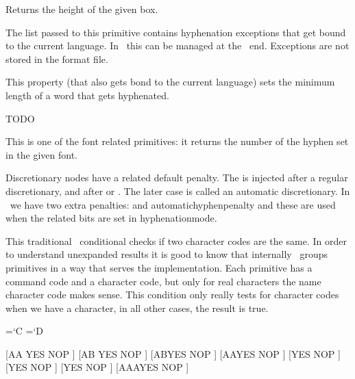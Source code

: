 Returns the height of the given box.

\stopoldprimitive

\startoldprimitive[title={\prm {hyphenation}}]

The list passed to this primitive contains hyphenation exceptions that get bound
to the current language. In \LUAMETATEX\ this can be managed at the \LUA\ end.
Exceptions are not stored in the format file.

\stopoldprimitive

\startnewprimitive[title={\prm {hyphenationmin}}]

This property (that also gets bond to the current language) sets the minimum
length of a word that gets hyphenated.

\stopnewprimitive

\startnewprimitive[title={\prm {hyphenationmode}}]
    TODO
\stopnewprimitive

\startoldprimitive[title={\prm {hyphenchar}}]

This is one of the font related primitives: it returns the number of the hyphen
set in the given font.

\stopoldprimitive

\startoldprimitive[title={\prm {hyphenpenalty}}]

Discretionary nodes have a related default penalty. The  is
injected after a regular discretionary, and  after \type
{\-} or \type {-}. The later case is called an automatic discretionary. In
\LUAMETATEX\ we have two extra penalties:  and \prm
{automatichyphenpenalty} and these are used when the related bits are set in \prm
{hyphenationmode}.

\stopoldprimitive

\startoldprimitive[title={\prm {if}}]

This traditional \TEX\ conditional checks if two character codes are the same. In
order to understand unexpanded results it is good to know that internally \TEX\
groups primitives in a way that serves the implementation. Each primitive has a
command code and a character code, but only for real characters the name
character code makes sense. This condition only really tests for character codes
when we have a character, in all other cases, the result is true.

\startbuffer
\def\A{A}\def\B{B} \chardef\C=`C \chardef\D=`D \def\AA{AA}

[\if AA   YES \else NOP \fi] [\if AB   YES \else NOP \fi]
[\if \A\B YES \else NOP \fi] [\if \A\A YES \else NOP \fi]
[\if \C\D YES \else NOP \fi] [\if \C\C YES \else NOP \fi]
[\if \count\dimen YES \else NOP \fi] [\if \AA\A YES \else NOP \fi]

